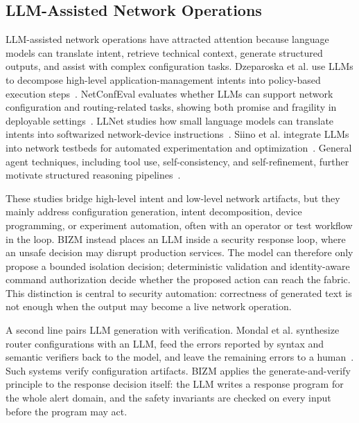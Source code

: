 \documentclass[final,5p]{elsarticle}
\begin{document}
\subsection{LLM-Assisted Network Operations}
\label{sec:rw_llm_agent}

LLM-assisted network operations have attracted attention because language models can translate intent, retrieve technical context, generate structured outputs, and assist with complex configuration tasks. Dzeparoska et al. use LLMs to decompose high-level application-management intents into policy-based execution steps~\cite{dzeparoska2023llmpolicy}. NetConfEval evaluates whether LLMs can support network configuration and routing-related tasks, showing both promise and fragility in deployable settings~\cite{wang2024netconfeval}. LLNet studies how small language models can translate intents into softwarized network-device instructions~\cite{angi2025llnet}. Siino et al. integrate LLMs into network testbeds for automated experimentation and optimization~\cite{siino2025llmtestbed}. General agent techniques, including tool use, self-consistency, and self-refinement, further motivate structured reasoning pipelines~\cite{schick2023toolformer,wang2023selfconsistency,madaan2023selfrefine,liu2023trustworthyllm}.

These studies bridge high-level intent and low-level network artifacts, but they mainly address configuration generation, intent decomposition, device programming, or experiment automation, often with an operator or test workflow in the loop. BIZM instead places an LLM inside a security response loop, where an unsafe decision may disrupt production services. The model can therefore only propose a bounded isolation decision; deterministic validation and identity-aware command authorization decide whether the proposed action can reach the fabric. This distinction is central to security automation: correctness of generated text is not enough when the output may become a live network operation.

A second line pairs LLM generation with verification. Mondal et al. synthesize router configurations with an LLM, feed the errors reported by syntax and semantic verifiers back to the model, and leave the remaining errors to a human~\cite{mondal2023routerconfig}. Such systems verify configuration artifacts. BIZM applies the generate-and-verify principle to the response decision itself: the LLM writes a response program for the whole alert domain, and the safety invariants are checked on every input before the program may act.
\end{document}
